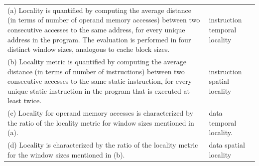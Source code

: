 \documentclass{article}
\begin{document}
\begin{enumerate}
    \begin{table}[htbp]
        \centering
        \renewcommand{\arraystretch}{2}
        \begin{tabular}{p{7cm}|p{2cm}} %
        (a) Locality is quantified by computing the average distance (in terms of number of operand memory accesses) between two consecutive accesses to the same address, for every unique address in the program. The evaluation is performed in four distinct window sizes, analogous to cache block sizes. 
        & instruction temporal locality \\
        (b) Locality metric is quantified by computing the average distance (in terms of number of instructions) between two consecutive accesses to the same static instruction, for every unique static instruction in the program that is executed at least twice.
        & instruction spatial locality \\
        (c) Locality for operand memory accesses is characterized by the ratio of the locality metric for window sizes mentioned in (a).
        & data temporal locality. \\
        (d) Locality is characterized by the ratio of the locality metric for the window sizes mentioned in (b).
        & data spatial locality \\
        \end{tabular}
        \label{tab:wrapped_table}
    \end{table}
\end{enumerate}
\end{document}
